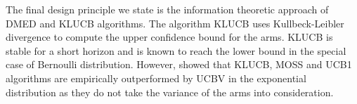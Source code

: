 	The final design principle we state is the information theoretic approach of DMED  \citep{honda2010asymptotically} and KLUCB \citep{garivier2011kl} algorithms. The algorithm KLUCB uses Kullbeck-Leibler divergence to compute the upper confidence bound for the arms. KLUCB is stable for a short horizon and is known to reach the \citet{lai1985asymptotically} lower bound in the special case of Bernoulli distribution. However, \citet{garivier2011kl} showed that KLUCB, MOSS and UCB1 algorithms are  empirically outperformed by UCBV in the exponential distribution as they do not take the variance of the arms into consideration. 